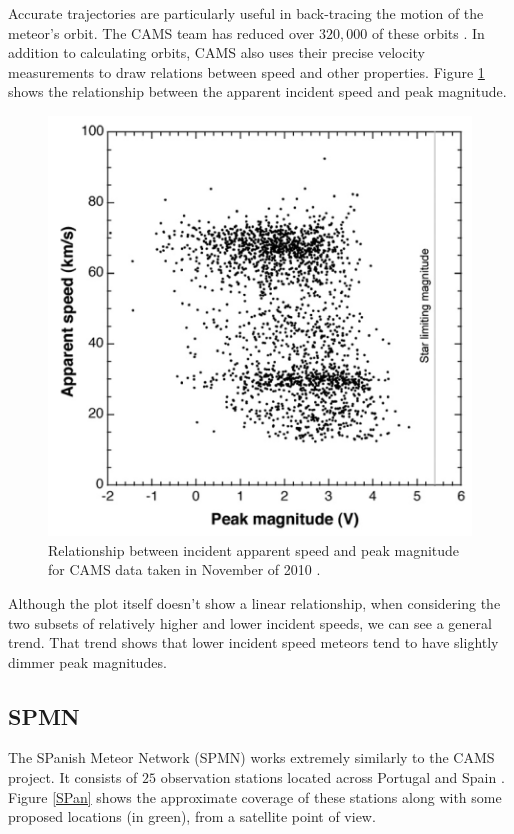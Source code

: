Accurate trajectories are particularly useful in back-tracing the motion of the meteor's orbit.  
The CAMS team has reduced over $320,000$ of these orbits \cite{seticams}. 
In addition to calculating orbits, CAMS also uses their precise velocity measurements to draw relations between speed and other properties. 
Figure \ref{fancyCAMS} shows the relationship between the apparent incident speed and peak magnitude.

\begin{figure}[ht!]
  \centering
  \includegraphics[scale=0.6]{images/CAMS_plot.png}
  \caption{Relationship between incident apparent speed and peak magnitude for CAMS data taken in November of 2010 \cite{jenniskens_cams:_2011}.}
  \label{fancyCAMS}
\end{figure}


Although the plot itself doesn't show a linear relationship, when considering the two subsets of relatively higher and lower incident speeds, we can see a general trend.
That trend shows that lower incident speed meteors tend to have slightly dimmer peak magnitudes. 



\subsection{SPMN}

The SPanish Meteor Network (SPMN) works extremely similarly to the CAMS project.  
It consists of $25$ observation stations located across Portugal and Spain \cite{trigo-rodriguez_2006_2007}.
Figure \ref{SPan} shows the approximate coverage of these stations along with some proposed locations (in green), from a satellite point of view.  

